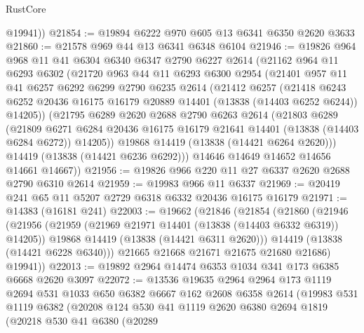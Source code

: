 \begin{lexlean}{RustCore}
\begin{coremodule}
        @19941))
@21854 := @19894 @6222 @970 @605 @13 @6341 @6350 @2620 @3633
@21860 := @21578 @969 @44 @13 @6341 @6348 @6104
@21946 := @19826
    @964
    @968
    @11
    @41
    @6304
    @6340
    @6347
    @2790
    @6227
    @2614
    (@21162
      @964
      @11
      @6293
      @6302
      (@21720
        @963
        @44
        @11
        @6293
        @6300
        @2954
        (@21401
          @957
          @11
          @41
          @6257
          @6292
          @6299
          @2790
          @6235
          @2614
          (@21412
            @6257
            (@21418
              @6243
              @6252
              @20436
              @16175
              @16179
              @20889
              @14401
              (@13838 (@14403 @6252 @6244))
              @14205))
          (@21795
            @6289
            @2620
            @2688
            @2790
            @6263
            @2614
            (@21803
              @6289
              (@21809
                @6271
                @6284
                @20436
                @16175
                @16179
                @21641
                @14401
                (@13838 (@14403 @6284 @6272))
                @14205))
            @19868
            @14419
            (@13838 (@14421 @6264 @2620)))
          @14419
          (@13838 (@14421 @6236 @6292)))
        @14646
        @14649
        @14652
        @14656
        @14661
        @14667))
@21956 := @19826 @966 @220 @11 @27 @6337 @2620 @2688 @2790 @6310 @2614
@21959 := @19983 @966 @11 @6337
@21969 := @20419 @241 @65 @11 @5207 @2729 @6318 @6332 @20436 @16175 @16179
@21971 := @14383 (@16181 @241)
@22003 := @19662
    (@21846
      (@21854
        (@21860
          (@21946
            (@21956
              (@21959 (@21969 @21971 @14401 (@13838 (@14403 @6332 @6319)) @14205))
              @19868
              @14419
              (@13838 (@14421 @6311 @2620)))
            @14419
            (@13838 (@14421 @6228 @6340)))
          @21665
          @21668
          @21671
          @21675
          @21680
          @21686)
        @19941))
@22013 := @19892 @2964 @14474 @6353 @1034 @341 @173 @6385 @6668 @2620 @3097
@22072 := @13536
    @19635
    @2964
    @2964
    @173
    @1119
    @2694
    @531
    @1033
    @650
    @6382
    @6667
    @162
    @2608
    @6358
    @2614
    (@19983
      @531
      @1119
      @6382
      (@20208
        @124
        @530
        @41
        @1119
        @2620
        @6380
        @2694
        @1819
        (@20218
          @530
          @41
          @6380
          (@20289

\end{coremodule}
\end{lexlean}
